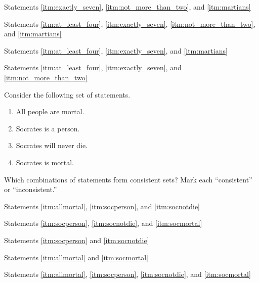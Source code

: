 \begin{exercises}
\item Statements \ref{itm:exactly_seven}, \ref{itm:not_more_than_two}, and \ref{itm:martians} 
\item Statements \ref{itm:at_least_four}, \ref{itm:exactly_seven}, \ref{itm:not_more_than_two}, and \ref{itm:martians} 
\item Statements \ref{itm:at_least_four}, \ref{itm:exactly_seven}, and \ref{itm:martians}
\item Statements \ref{itm:at_least_four}, \ref{itm:exactly_seven}, and \ref{itm:not_more_than_two} 
\end{exercises}

\noindent \problempart Consider the following set of statements.
\begin{enumerate}[label=(\alph*)]
\item \label{itm:allmortal} All people are mortal.
\item \label{itm:socperson} Socrates is a person.
\item \label{itm:socnotdie} Socrates will never die.
\item \label{itm:socmortal} Socrates is mortal.
\end{enumerate}
Which combinations of statements form consistent sets? Mark each “consistent” or “inconsistent.”
\begin{exercises}
\item Statements \ref{itm:allmortal}, \ref{itm:socperson}, and \ref{itm:socnotdie}  
\item Statements \ref{itm:socperson}, \ref{itm:socnotdie}, and \ref{itm:socmortal} 
\item Statements \ref{itm:socperson} and \ref{itm:socnotdie} 
\item Statements \ref{itm:allmortal} and \ref{itm:socmortal} 
\item Statements \ref{itm:allmortal}, \ref{itm:socperson}, \ref{itm:socnotdie}, and \ref{itm:socmortal}  
\end{exercises}

